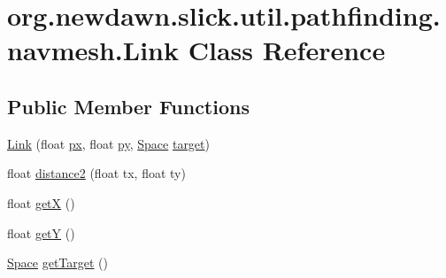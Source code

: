 \hypertarget{classorg_1_1newdawn_1_1slick_1_1util_1_1pathfinding_1_1navmesh_1_1_link}{}\section{org.\+newdawn.\+slick.\+util.\+pathfinding.\+navmesh.\+Link Class Reference}
\label{classorg_1_1newdawn_1_1slick_1_1util_1_1pathfinding_1_1navmesh_1_1_link}
\subsection*{Public Member Functions}
\begin{DoxyCompactItemize}
\item 
\mbox{\hyperlink{classorg_1_1newdawn_1_1slick_1_1util_1_1pathfinding_1_1navmesh_1_1_link_a227fb2c96e55e5637e38d354044b149d}{Link}} (float \mbox{\hyperlink{classorg_1_1newdawn_1_1slick_1_1util_1_1pathfinding_1_1navmesh_1_1_link_a83c2e5065b4ed17f607670d6d295bdb0}{px}}, float \mbox{\hyperlink{classorg_1_1newdawn_1_1slick_1_1util_1_1pathfinding_1_1navmesh_1_1_link_afeb36f879009f5cda66275dd065dfdf2}{py}}, \mbox{\hyperlink{classorg_1_1newdawn_1_1slick_1_1util_1_1pathfinding_1_1navmesh_1_1_space}{Space}} \mbox{\hyperlink{classorg_1_1newdawn_1_1slick_1_1util_1_1pathfinding_1_1navmesh_1_1_link_a8820429c2405bded1a2414a245745adf}{target}})
\item 
float \mbox{\hyperlink{classorg_1_1newdawn_1_1slick_1_1util_1_1pathfinding_1_1navmesh_1_1_link_abae9f3276743edc641346bfa17deb542}{distance2}} (float tx, float ty)
\item 
float \mbox{\hyperlink{classorg_1_1newdawn_1_1slick_1_1util_1_1pathfinding_1_1navmesh_1_1_link_acb0934e4dbdde87a43885d3d09cd483f}{getX}} ()
\item 
float \mbox{\hyperlink{classorg_1_1newdawn_1_1slick_1_1util_1_1pathfinding_1_1navmesh_1_1_link_a6e107389c6c50466b18c78f0e7e0ae5c}{getY}} ()
\item 
\mbox{\hyperlink{classorg_1_1newdawn_1_1slick_1_1util_1_1pathfinding_1_1navmesh_1_1_space}{Space}} \mbox{\hyperlink{classorg_1_1newdawn_1_1slick_1_1util_1_1pathfinding_1_1navmesh_1_1_link_aeb76f2571abc64ff370e14ea6c16dd62}{get\+Target}} ()
\end{DoxyCompactItemize}
